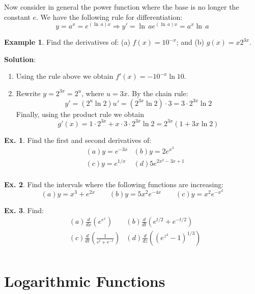 \documentclass[10pt,a4paper]{book}
\theoremstyle{definition}\newtheorem{definition}{Definition}
\theoremstyle{definition}\newtheorem{fact}{Fact}
\theoremstyle{definition}\newtheorem{ex}{Ex.}
\theoremstyle{definition}\newtheorem{project}{Project}
\theoremstyle{definition}\newtheorem{problem}{Problem}
\theoremstyle{definition}\newtheorem{example}{Example}
\numberwithin{theorem}{chapter}
\numberwithin{corollary}{chapter}
\numberwithin{assumption}{chapter}
\numberwithin{definition}{chapter}
\numberwithin{prop}{chapter}
\numberwithin{notation}{chapter}
\numberwithin{problem}{chapter}
\numberwithin{example}{chapter}
\numberwithin{fact}{chapter}
\numberwithin{ex}{chapter}
\begin{document}
	Now consider in general the power function where the base is no longer the constant $e$. We have the following rule for differentiation:
	$$y=a^x =e^{(\ln\,a)x} \Rightarrow y' = \ln\,a e^{(\ln\,a)x} = a^x \ln\,a $$
	
	\begin{example}
		Find the derivatives of: (a) $f(x) = 10^{-x}$; and (b) $g(x) = x2^{3x}$.
		
		\textbf{Solution}:
		\begin{enumerate}[label=(\alph*)]
			\item Using the rule above we obtain $f'(x)=-10^{-x} \ln10$.
			\item Rewrite $y = 2^{3x} = 2^u$, where $u = 3x$. By the chain rule:
			$$y'=(2^u\ln2)u' =(2^{3x}\ln2)\cdot3=3\cdot2^{3x}\ln2$$
			Finally, using the product rule we obtain
			$$g'(x) = 1 \cdot 2^{3x} + x \cdot 3 \cdot 2^{3x} \ln 2 = 2^{3x}(1 + 3x \ln 2)$$
		\end{enumerate}
	\end{example}
	
	\begin{ex}
		Find the first and second derivatives of:
		\begin{align*}
			& (a) y=e^{-3x}      
			& (b) y=2e^{x^3}     \\
			& (c) y=e^{1/x}      
			& (d) 5e^{2x^2-3x+1} \\
		\end{align*}
	\end{ex}
	
	\begin{ex}
		Find the intervals where the following functions are increasing:
		\begin{equation*}
			(a) y=x^3+e^{2x} \qquad
			(b) y=5x^2e^{-4x} \qquad
			(c) y=x^2e^{-x^2}
		\end{equation*}
	\end{ex}
	
	\begin{ex}
		Find:
		\begin{align*}
			& (a) \frac{d}{dx}\left( e^{e^x} \right)              
			& (b) \frac{d}{dt}\left( e^{t/2}+e^{-t/2} \right)     \\
			& (c) \frac{d}{dt}\left( \frac{1}{e^t+e^{-t}} \right) 
			& (d) \frac{d}{dz}\left( (e^{z^3}-1)^{1/3} \right)    \\
		\end{align*}
	\end{ex}
	
	\section{Logarithmic Functions}
	
\end{document}
